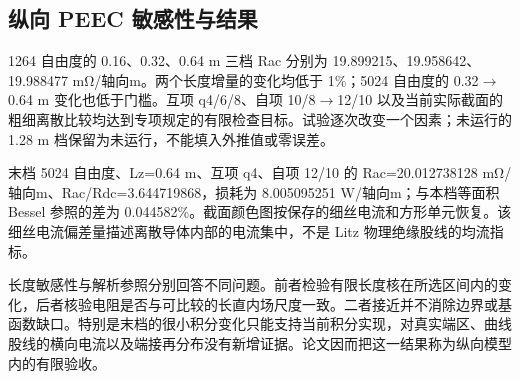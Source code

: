 \documentclass[journal,10pt]{IEEEtran}
\begin{document}
\subsection*{纵向 PEEC 敏感性与结果}
\hypertarget{06.peec_results.heading}{}
1264 自由度的 0.16、0.32、0.64 m 三档 Rac 分别为 19.899215、19.958642、19.988477 mΩ/轴向m。两个长度增量的变化均低于 1\%；5024 自由度的 0.32\(\to\)0.64 m 变化也低于门槛。互项 q4/6/8、自项 10/8\(\to\)12/10 以及当前实际截面的粗细离散比较均达到专项规定的有限检查目标。试验逐次改变一个因素；未运行的 1.28 m 档保留为未运行，不能填入外推值或零误差。


末档 5024 自由度、Lz=0.64 m、互项 q4、自项 12/10 的 Rac=20.012738128 mΩ/轴向m、Rac/Rdc=3.644719868，损耗为 8.005095251 W/轴向m；与本档等面积 Bessel 参照的差为 0.044582\%。截面颜色图按保存的细丝电流和方形单元恢复。该细丝电流偏差量描述离散导体内部的电流集中，不是 Litz 物理绝缘股线的均流指标。


长度敏感性与解析参照分别回答不同问题。前者检验有限长度核在所选区间内的变化，后者核验电阻是否与可比较的长直内场尺度一致。二者接近并不消除边界或基函数缺口。特别是末档的很小积分变化只能支持当前积分实现，对真实端区、曲线股线的横向电流以及端接再分布没有新增证据。论文因而把这一结果称为纵向模型内的有限验收。
\end{document}

